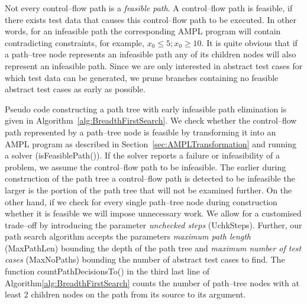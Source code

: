 \documentclass[runningheads,a4paper]{llncs}%
\newcommand{\UMLType}[1]{\textsf{\textit{#1}}} %
\begin{document}
Not every control--flow path is a \emph{feasible path}. A control--flow path is
feasible, if there exists test data that causes this control--flow path to be
executed. In other words, for an infeasible path the corresponding AMPL program
will contain contradicting constraints, for example, $x_0\leq5; x_0\geq10$. It
is quite obvious that if a path--tree node represents an infeasible path any of
its children nodes will also represent an infeasible path. Since we are only
interested in abstract test cases for which test data can be generated, we prune
branches containing no feasible abstract test cases as early as possible.

Pseudo code constructing a path tree with early infeasible path elimination is
given in Algorithm~\ref{alg:BreadthFirstSearch}. We check whether the
control--flow path represented by a path--tree node is feasible by transforming
it into an AMPL program as described in Section~\ref{sec:AMPLTransformation} and
running a solver (isFeasiblePath()). If the solver reports a failure or
infeasibility of a problem, we assume the control--flow path to be infeasible.
The earlier during construction of the path tree a control--flow path is
detected to be infeasible the larger is the portion of the path tree that will
not be examined further. On the other hand, if we check for every single
path--tree node during construction whether it is feasible we will impose
unnecessary work. We allow for a customised trade--off by introducing the
parameter \emph{unchecked steps} (UchkSteps). Further, our path search algorithm
accepts the parameters \emph{maximum path length} (MaxPathLen) bounding the
depth of the path tree and \emph{maximum number of test cases} (MaxNoPaths)
bounding the number of abstract test cases to find. The function
countPathDecisionsTo() in the third last line of
Algorithm\ref{alg:BreadthFirstSearch} counts the number of path--tree nodes with
at least 2 children nodes on the path from its source to its argument. %
\end{document}
